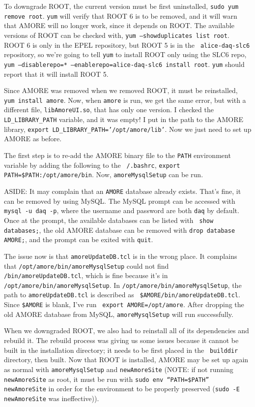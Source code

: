 \documentclass[12pt]{article}
\begin{document}
\qq To downgrade ROOT, the current version must be first uninstalled, {\tt sudo
  yum remove root}. {\tt yum} will verify that ROOT 6 is to be removed, and it
will warn that AMORE will no longer work, since it depends on ROOT. The
available versions of ROOT can be checked with, {\tt yum --showduplicates list
  root}. ROOT 6 is only in the EPEL repository, but ROOT 5 is in the {\tt
  alice-daq-slc6} repository, so we're going to tell {\tt yum} to install ROOT
only using the SLC6 repo, {\tt yum --disablerepo=* --enablerepo=alice-daq-slc6
  install root}. {\tt yum} should report that it will install ROOT 5.

\qq Since AMORE was removed when we removed ROOT, it must be reinstalled, {\tt
  yum install amore}. Now, when {\tt amore} is run, we get the same error, but
with a different file, {\tt libAmoreUI.so}, that has only one version. I checked
the {\tt LD\_LIBRARY\_PATH} variable, and it was empty! I put in the path to the
AMORE library, {\tt export LD\_LIBRARY\_PATH='/opt/amore/lib'}. Now we just need
to set up AMORE as before.

\qq The first step is to re-add the AMORE binary file to the {\tt PATH}
environment variable by adding the following to the {\tt ~/.bashrc}, {\tt export
  PATH=\$PATH:/opt/amore/bin}. Now, {\tt amoreMysqlSetup} can be run. 

\qq ASIDE: It may complain that an {\tt AMORE} database already exists. That's fine, it
can be removed by using MySQL. The MySQL prompt can be accessed with {\tt mysql
  -u daq -p}, where the username and password are both {\tt daq} by
default. Once at the prompt, the available databases can be listed with {\tt
  show databases;}, the old AMORE database can be removed with {\tt drop
  database AMORE;}, and the prompt can be exited with {\tt quit}.

\qq The issue now is that {\tt amoreUpdateDB.tcl} is in the wrong place. It
complains that {\tt /opt/amore/bin/amoreMysqlSetup} could not find {\tt
  /bin/amoreUpdateDB.tcl}, which is fine because it's in {\tt
  /opt/amore/bin/amoreMysqlSetup}. In {\tt /opt/amore/bin/amoreMysqlSetup}, the
path to {\tt amoreUpdateDB.tcl} is described as {\tt
  \$AMORE/bin/amoreUpdateDB.tcl}. Since {\tt \$AMORE} is blank, I've run {\tt
  export AMORE=/opt/amore}. After dropping the old AMORE database from MySQL,
{\tt amoreMysqlSetup} will run successfully.

\qq When we downgraded ROOT, we also had to reinstall all of its dependencies
and rebuild it. The rebuild process was giving us some issues because it cannot
be built in the installation directory; it needs to be first placed in the {\tt
  builddir} directory, then built. Now that ROOT is installed, AMORE may be set
up again as normal with {\tt amoreMysqlSetup} and {\tt newAmoreSite} (NOTE: if
not running {\tt newAmoreSite} as root, it must be run with {\tt sudo env
  ``PATH=\$PATH'' newAmoreSite} in order for the environment to be properly
preserved ({\tt sudo -E newAmoreSite} was ineffective)).
\end{document}
